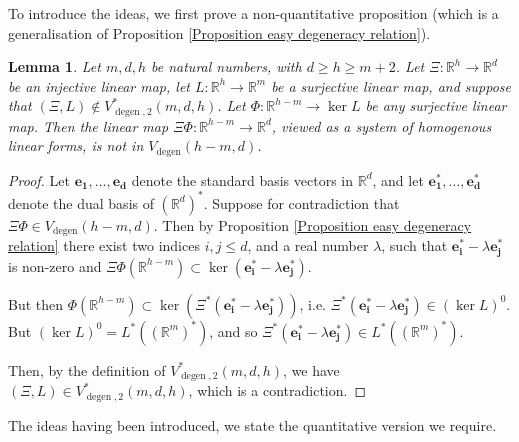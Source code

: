 \documentclass[12pt,a4paper,twoside,reqno]{amsart}
\newtheorem{Lemma}[Theorem]{Lemma}
\newcommand{\degen}{\operatorname{degen}}
\numberwithin{equation}{section}
\begin{document}
To introduce the ideas, we first prove a non-quantitative proposition (which is a generalisation of Proposition \ref{Proposition easy degeneracy relation}).

\begin{Lemma}
\label{Lemma non quantitative equivalence of degeneracies}
Let $m,d,h$ be natural numbers, with $d\geqslant h\geqslant  m+2$. Let $\Xi:\mathbb{R}^h\longrightarrow \mathbb{R}^d$ be an injective linear map, let $L:\mathbb{R}^h\longrightarrow \mathbb{R}^m$ be a surjective linear map, and suppose that $(\Xi,L)\notin V^*_{\degen,2}(m,d,h)$. Let $\Phi:\mathbb{R}^{h-m}\longrightarrow \ker L$ be any surjective linear map. Then the linear map $\Xi \Phi:\mathbb{R}^{h-m} \longrightarrow \mathbb{R}^d$, viewed as a system of homogenous linear forms, is not in $V_{\degen}(h-m,d)$.  
\end{Lemma}
\begin{proof}
Let $\mathbf{e_1},\dots,\mathbf{e_d}$ denote the standard basis vectors in $\mathbb{R}^d$, and let $\mathbf{e}_\mathbf{1}^*, \dots,\mathbf{e}_\mathbf{d}^*$ denote the dual basis of $(\mathbb{R}^d)^*$. Suppose for contradiction that $\Xi\Phi \in V_{\degen}(h-m,d)$. Then by Proposition \ref{Proposition easy degeneracy relation} there exist two indices $i,j\leqslant d$, and a real number $\lambda$, such that $\mathbf{e}_{\mathbf{i}}^* - \lambda \mathbf{e}_{\mathbf{j}}^*$ is non-zero and $\Xi\Phi(\mathbb{R}^{h-m})\subset \ker (\mathbf{e}_{\mathbf{i}}^* - \lambda \mathbf{e}_{\mathbf{j}}^*)$. 

But then $\Phi(\mathbb{R}^{h-m}) \subset \ker (\Xi^*(\mathbf{e}_{\mathbf{i}}^* - \lambda \mathbf{e}_{\mathbf{j}}^*))$, i.e. $\Xi^*(\mathbf{e}_{\mathbf{i}}^* - \lambda \mathbf{e}_{\mathbf{j}}^*) \in (\ker L)^{0}$. But $(\ker L)^{0} = L^*((\mathbb{R}^m)^*)$, and so $\Xi^*(\mathbf{e}_{\mathbf{i}}^* - \lambda \mathbf{e}_{\mathbf{j}}^*) \in L^*((\mathbb{R}^m)^*)$. 

Then, by the definition of $V_{\degen,2}^*(m,d,h)$, we have $(\Xi,L)\in V^*_{\degen,2}(m,d,h)$, which is a contradiction. 
\end{proof}

The ideas having been introduced, we state the quantitative version we require. 
\end{document}
